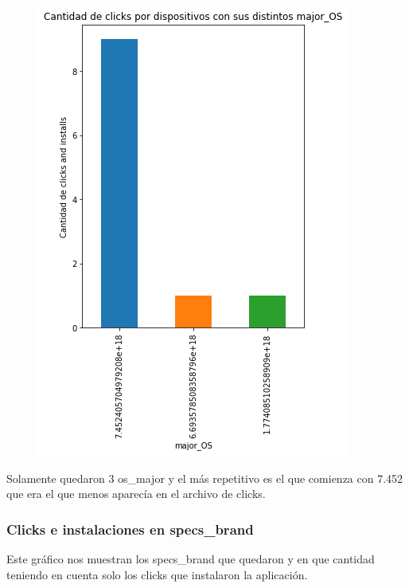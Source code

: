 \documentclass[a4paper, 12pt]{article}
\newcommand\tab[1][1cm]{\hspace*{#1}}
\begin{document}
{{	\FloatBarrier
		\begin{figure}[h]
			\centering
			\includegraphics[scale = 0.5]{images/clicks-installs/major_os.png}
			\caption{}
		\end{figure}
	\FloatBarrier

	\tab Solamente quedaron 3 os\_major y el más repetitivo es el que comienza con 7.452 que era el que menos aparecía en el archivo de clicks.
	
	\subsubsection{Clicks e instalaciones en specs\_brand}
	\tab Este gráfico nos muestran los specs\_brand que quedaron y en que cantidad teniendo en cuenta solo los clicks que instalaron la aplicación.
	
}}
\end{document}
